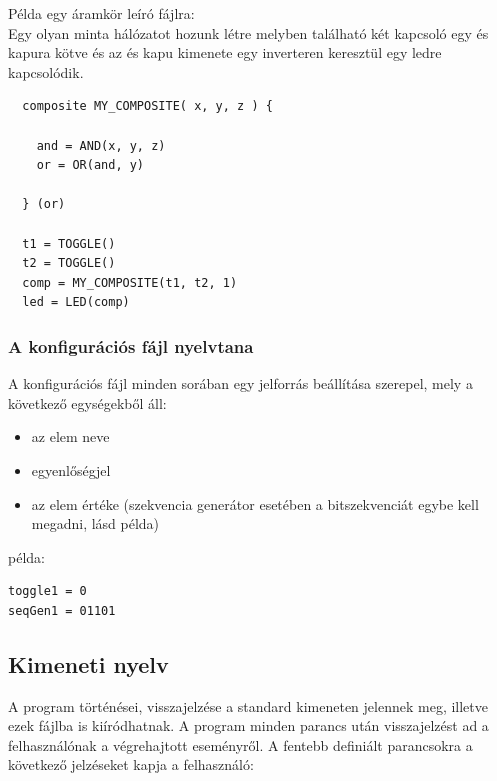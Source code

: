 Példa egy áramkör leíró fájlra:\\

Egy olyan minta hálózatot hozunk létre melyben található két kapcsoló egy és kapura kötve és az és kapu kimenete egy inverteren keresztül egy ledre kapcsolódik.
\begin{verbatim}
  composite MY_COMPOSITE( x, y, z ) {

    and = AND(x, y, z)
    or = OR(and, y)

  } (or)

  t1 = TOGGLE()
  t2 = TOGGLE()
  comp = MY_COMPOSITE(t1, t2, 1)
  led = LED(comp)
\end{verbatim}	

\subsubsection{A konfigurációs fájl nyelvtana}
\label{sec:settings_def}

A konfigurációs fájl minden sorában egy jelforrás beállítása szerepel, mely a következő egységekből áll:
\begin{itemize}
	\item az elem neve
	\item egyenlőségjel
	\item az elem értéke (szekvencia generátor esetében a bitszekvenciát egybe kell megadni, lásd példa)
\end{itemize}

példa:
\begin{verbatim}
toggle1 = 0
seqGen1 = 01101
\end{verbatim}

\subsection{Kimeneti nyelv}
\label{sec:output}

A program történései, visszajelzése a standard kimeneten jelennek meg, illetve ezek fájlba is kiíródhatnak. A program minden parancs után visszajelzést ad a felhasználónak a végrehajtott eseményről. A fentebb definiált parancsokra a következő jelzéseket kapja a felhasználó:\newline

